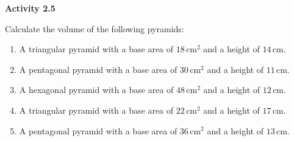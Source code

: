   \vspace{1ex}
\noindent\textbf{Activity 2.5}

\vspace{0.75ex}

Calculate the volume of the following pyramids:
\begin{enumerate}[noitemsep, label = \color{blue}\arabic*. ]
    \item A triangular pyramid with a base area of \(18 \, \text{cm}^2\) and a height of \(14 \, \text{cm}\).
    \item A pentagonal pyramid with a base area of \(30 \, \text{cm}^2\) and a height of \(11 \, \text{cm}\).
    \item A hexagonal pyramid with a base area of \(48 \, \text{cm}^2\) and a height of \(12 \, \text{cm}\).
    \item A triangular pyramid with a base area of \(22 \, \text{cm}^2\) and a height of \(17 \, \text{cm}\).
    \item A pentagonal pyramid with a base area of \(36 \, \text{cm}^2\) and a height of \(13 \, \text{cm}\).
\end{enumerate}

 
